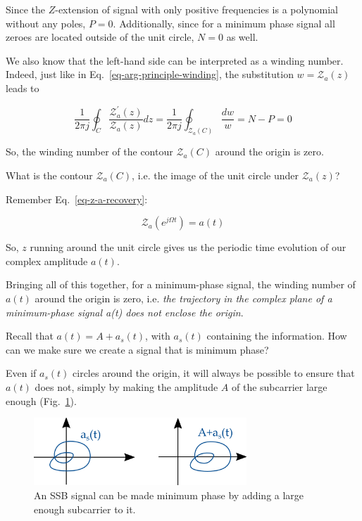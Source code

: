 Since the $Z$-extension of signal with only positive frequencies is a polynomial without any poles, $P=0$. Additionally, since for a minimum phase signal all zeroes are located outside of the unit circle, $N=0$ as well.

We also know that the left-hand side can be interpreted as a winding number. Indeed, just like in Eq.~\ref{eq-arg-principle-winding}, the substitution $w=\mathcal{Z}_a(z)$ leads to 

\begin{equation}
\frac{1}{2 \pi j }\oint_C \frac{\mathcal{Z}_a^{'}(z)}{\mathcal{Z}_a(z)} dz = \frac{1}{2 \pi j }\oint_{\mathcal{Z}_a(C)} \frac{dw}{w} = N-P = 0
\end{equation}

So, the winding number of the contour $\mathcal{Z}_a(C)$ around the origin is zero.

\begin{cue}
What is the contour $\mathcal{Z}_a(C)$, i.e. the image of the unit circle under $\mathcal{Z}_a(z)$? 
\end{cue}

Remember Eq.~\ref{eq-z-a-recovery}:

\begin{equation}
\mathcal{Z}_a\left(e^{j\Omega t}\right) = a(t)
\end{equation}

So, $z$ running around the unit circle gives us the periodic time evolution of our complex amplitude $a(t)$.

\pagebreak

Bringing all of this together, for a minimum-phase signal, the winding number of $a(t)$ around the origin is zero, i.e. \emph{the trajectory in the complex plane of a minimum-phase signal a(t) does not enclose the origin}.

\begin{cue}
Recall that $a(t) = A + a_s(t)$, with $a_s(t)$ containing the information. How can we make sure we create a signal that is minimum phase?
\end{cue}

Even if $a_s(t)$ circles around the origin, it will always be possible to ensure that $a(t)$ does not, simply by making the amplitude $A$ of the subcarrier large enough (Fig.~\ref{fig-make-min-phase}).

\begin{figure}[h]
\centering
\includegraphics[width=8cm]{kk/figures/making min phase.png}
\caption{An SSB signal can be made minimum phase by adding a large enough subcarrier to it.}
\label{fig-make-min-phase}
\end{figure}
    
